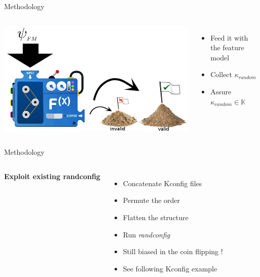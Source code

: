 \documentclass[mathserif,serif]{beamer}
\newenvironment{items}{
\begin{itemize}
  \setlength{\itemsep}{0pt}
  \setlength{\parskip}{7pt}
  \setlength{\parsep}{4pt}
}{\end{itemize}}
\begin{document}
\begin{frame}[t]{Methodology}


    \begin{columns}[T]
        \includegraphics[scale=.5]{machine.png}
        \begin{items}
            \item Feed it with the feature model
            \pause
            \item Collect $\kappa_{random}$
            \pause
            \item Assure $\kappa_{random} \in \mathbb{K}$
        \end{items}
    \end{columns}
\end{frame}
    

\begin{frame}[t]{Methodology}

    \begin{columns}[T]
        \textbf{Exploit existing randconfig}
        \pause
        \begin{items}
            \item Concatenate Kconfig files
            \item Permute the order
            \item Flatten the structure
            \pause
            \item Run \emph{randconfig}
            \pause
            \item Still biased in the coin flipping !
            \pause
            \item See following Kconfig example
        \end{items}
    \end{columns}

\end{frame}
\end{document}
